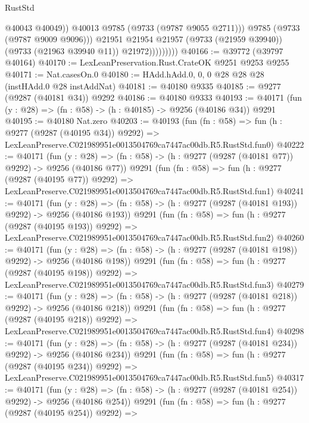 \begin{lexlean}{RustStd}
\begin{coremodule}
                              @40043
                              @40049))
                          @40013
                          @9785
                          (@9733 (@9787 @9055 @2711)))
                        @9785
                        (@9733 (@9787 @9009 @9096)))
                      @21951
                      @21954
                      @21957
                      (@9733 (@21959 @39940))
                      (@9733 (@21963 @39940 @11))
                      @21972)))))))))
@40166 := @39772 (@39797 @40164)
@40170 := LexLeanPreservation.Rust.CrateOK @9251 @9253 @9255
@40171 := Nat.casesOn.{0}
@40180 := HAdd.hAdd.{0, 0, 0} @28 @28 @28 (instHAdd.{0} @28 instAddNat)
@40181 := @40180 @9335
@40185 := @9277 (@9287 (@40181 @34)) @9292
@40186 := @40180 @9333
@40193 := @40171 (fun (y : @28) => (fn : @58) -> (h : @40185) -> @9256 (@40186 @34)) @9291
@40195 := @40180 Nat.zero
@40203 := @40193
    (fun (fn : @58) =>
    fun (h : @9277 (@9287 (@40195 @34)) @9292) =>
    LexLeanPreserve.C021989951e0013504769ca7447ac00db.R5.RustStd.fun0)
@40222 := @40171
    (fun (y : @28) => (fn : @58) -> (h : @9277 (@9287 (@40181 @77)) @9292) -> @9256 (@40186 @77))
    @9291
    (fun (fn : @58) =>
    fun (h : @9277 (@9287 (@40195 @77)) @9292) =>
    LexLeanPreserve.C021989951e0013504769ca7447ac00db.R5.RustStd.fun1)
@40241 := @40171
    (fun (y : @28) => (fn : @58) -> (h : @9277 (@9287 (@40181 @193)) @9292) -> @9256 (@40186 @193))
    @9291
    (fun (fn : @58) =>
    fun (h : @9277 (@9287 (@40195 @193)) @9292) =>
    LexLeanPreserve.C021989951e0013504769ca7447ac00db.R5.RustStd.fun2)
@40260 := @40171
    (fun (y : @28) => (fn : @58) -> (h : @9277 (@9287 (@40181 @198)) @9292) -> @9256 (@40186 @198))
    @9291
    (fun (fn : @58) =>
    fun (h : @9277 (@9287 (@40195 @198)) @9292) =>
    LexLeanPreserve.C021989951e0013504769ca7447ac00db.R5.RustStd.fun3)
@40279 := @40171
    (fun (y : @28) => (fn : @58) -> (h : @9277 (@9287 (@40181 @218)) @9292) -> @9256 (@40186 @218))
    @9291
    (fun (fn : @58) =>
    fun (h : @9277 (@9287 (@40195 @218)) @9292) =>
    LexLeanPreserve.C021989951e0013504769ca7447ac00db.R5.RustStd.fun4)
@40298 := @40171
    (fun (y : @28) => (fn : @58) -> (h : @9277 (@9287 (@40181 @234)) @9292) -> @9256 (@40186 @234))
    @9291
    (fun (fn : @58) =>
    fun (h : @9277 (@9287 (@40195 @234)) @9292) =>
    LexLeanPreserve.C021989951e0013504769ca7447ac00db.R5.RustStd.fun5)
@40317 := @40171
    (fun (y : @28) => (fn : @58) -> (h : @9277 (@9287 (@40181 @254)) @9292) -> @9256 (@40186 @254))
    @9291
    (fun (fn : @58) =>
    fun (h : @9277 (@9287 (@40195 @254)) @9292) =>

\end{coremodule}
\end{lexlean}

